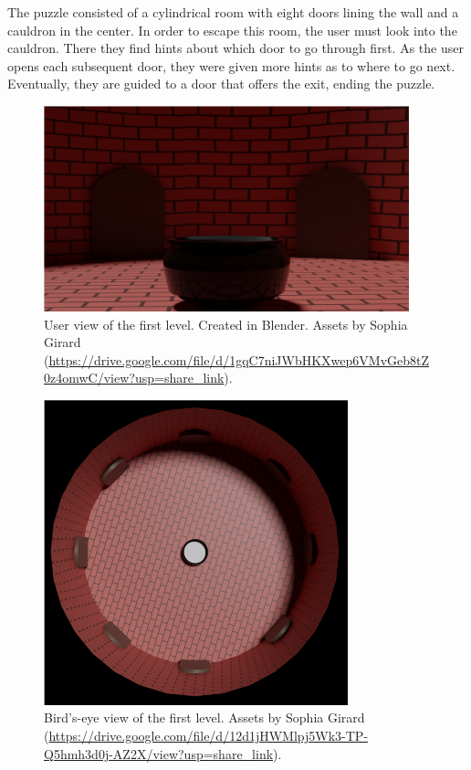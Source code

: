 \documentclass[manuscript,screen,review]{acmart}
\begin{document}
The puzzle consisted of a cylindrical room with eight doors lining the wall and a cauldron in the center. In order to escape this room, the user must look into the cauldron. There they find hints about which door to go through first. As the user opens each subsequent door, they were given more hints as to where to go next. Eventually, they are guided to a door that offers the exit, ending the puzzle. 
\clearpage

\begin{figure}[h]
  \centering
  \includegraphics[width=300pt]{UserView.png}
  \caption{User view of the first level. Created in Blender. Assets by Sophia Girard (\url{https://drive.google.com/file/d/1gqC7niJWbHKXwep6VMvGeb8tZ0z4omwC/view?usp=share_link}).}
\end{figure}

\begin{figure}[h]
  \centering
  \includegraphics[width=250pt]{OverheadView.png}
  \caption{Bird's-eye view of the first level. Assets by Sophia Girard
  (\url{https://drive.google.com/file/d/12d1jHWMlpj5Wk3-TP-Q5hmh3d0j-AZ2X/view?usp=share_link}).}
\end{figure}
\clearpage
\end{document}

